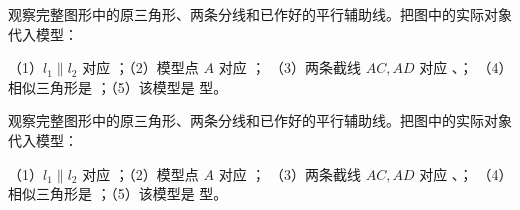 \documentclass{exam-zh}
\newcounter{solstep}
\begin{document}
\begin{problem}[points=10]
  \noindent
  \begin{minipage}[t]{\dimexpr\linewidth-60mm-6mm\relax}
    \vspace{0pt}
    观察完整图形中的原三角形、两条分线和已作好的平行辅助线。把图中的实际对象代入模型：

（1）$l_1\parallel l_2$ 对应 \underline{\hspace{2cm}}；（2）模型点 $A$ 对应 \underline{\hspace{1cm}}；
（3）两条截线 $AC,AD$ 对应 \underline{\hspace{1.5cm}}、\underline{\hspace{1.5cm}}；
（4）相似三角形是 \underline{\hspace{4cm}}；（5）该模型是 \underline{\hspace{1.5cm}} 型。


  \end{minipage}\hfill
  \begin{diagramcoltikz}{60mm}{第 2 题图}
  }
  \end{diagramcoltikz}
  \par\medskip
  \answerarea[32mm]
  \setcounter{solstep}{0}
  \begin{solutionblock}
  \end{solutionblock}
\end{problem}



\begin{problem}[points=10]
  \noindent
  \begin{minipage}[t]{\dimexpr\linewidth-60mm-6mm\relax}
    \vspace{0pt}
    观察完整图形中的原三角形、两条分线和已作好的平行辅助线。把图中的实际对象代入模型：

（1）$l_1\parallel l_2$ 对应 \underline{\hspace{2cm}}；（2）模型点 $A$ 对应 \underline{\hspace{1cm}}；
（3）两条截线 $AC,AD$ 对应 \underline{\hspace{1.5cm}}、\underline{\hspace{1.5cm}}；
（4）相似三角形是 \underline{\hspace{4cm}}；（5）该模型是 \underline{\hspace{1.5cm}} 型。


  \end{minipage}\hfill
  \begin{diagramcoltikz}{60mm}{第 3 题图}
  }
  \end{diagramcoltikz}
  \par\medskip
  \answerarea[32mm]
  \setcounter{solstep}{0}
  \begin{solutionblock}
  \end{solutionblock}
\end{problem}
\end{document}
